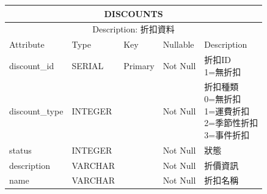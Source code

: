 \documentclass[a4paper, 12pt]{article}
\begin{document}
\noindent\begin{tabular}{ | p{7em} | p{5.5em} | p{5.5em} | p{4.5em} | p{11em} |}
  \hline
  \multicolumn{5}{|c|}{DISCOUNTS} \tabularnewline
  \hline 
  \multicolumn{5}{|c|}{Description: 折扣資料} \tabularnewline
  \hline 
  Attribute & Type & Key & Nullable & Description \\
  \hline
  discount_id & SERIAL & Primary & Not Null & \makecell[l]{折扣ID\\1=無折扣} \\
  \hline
  discount_type & INTEGER &  & Not Null & \makecell[l]{折扣種類\\0=無折扣\\1=運費折扣\\2=季節性折扣\\3=事件折扣} \\
  \hline
  status & INTEGER & &Not Null &狀態\\
  \hline
  description& VARCHAR &  &Not Null &折價資訊\\
  \hline
  name & VARCHAR &  &Not Null &折扣名稱\\
  \hline
\end{tabular}
\vspace{1em}
\end{document}
